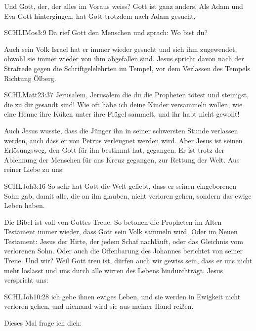 \documentclass[fontsize=16pt]{mybib}
\begin{document}
    Und Gott, der, der alles im Voraus weiss? Gott ist ganz anders. Als Adam und Eva Gott hintergingen, hat Gott trotzdem nach Adam gesucht.
    \begin{bibelbox}{SCHL}{IMos}{3:9}
    Da rief Gott den Menschen und sprach: Wo bist du?
    \end{bibelbox}
    Auch sein Volk Israel hat er immer wieder gesucht und sich ihm zugewendet, obwohl sie immer wieder von ihm abgefallen sind. Jesus spricht davon nach der Strafrede gegen die Schriftgelelehrten im Tempel, vor dem Verlassen des Tempels Richtung Ölberg. 
    \begin{bibelbox}{SCHL}{Matt}{23:37}
        Jerusalem, Jerusalem die du die Propheten tötest und steinigst, die zu dir gesandt sind! Wie oft habe ich deine Kinder versammeln wollen, wie eine Henne ihre Küken unter ihre Flügel sammelt, und ihr habt nicht gewollt!
    \end{bibelbox}
    Auch Jesus wusste, dass die Jünger ihn in seiner schwersten Stunde verlassen werden, auch dass er von Petrus verleugnet werden wird. Aber Jesus ist seinen Erlösungsweg, den Gott für ihn bestimmt hat, gegangen. Er ist trotz der Ablehnung der Menschen für ans Kreuz gegangen, zur Rettung der Welt. Aus reiner Liebe zu uns:
    \begin{bibelbox}{SCHL}{Joh}{3:16}
    So sehr hat Gott die Welt geliebt, dass er seinen eingeborenen Sohn gab, damit alle, die an ihn glauben, nicht verloren gehen, sondern das ewige Leben haben.
    \end{bibelbox}
    Die Bibel ist voll von Gottes Treue. So betonen die Propheten im Alten Testament immer wieder, dass Gott sein Volk sammeln wird. Oder im Neuen Testament: Jesus der Hirte, der jedem Schaf nachläuft, oder das Gleichnis vom verlorenen Sohn. Oder auch die Offenbarung des Johannes berichtet von seiner Treue. Und wir? Weil Gott treu ist, dürfen auch wir gewiss sein, dass er uns nicht mehr loslässt und uns durch alle wirren des Lebens hindurchträgt. Jesus verspricht uns:
    \begin{bibelbox}{SCHL}{Joh}{10:28}
    ich gebe ihnen ewiges Leben, und sie werden in Ewigkeit nicht verloren gehen, und niemand wird sie aus meiner Hand reißen.
    \end{bibelbox}
    Dieses Mal frage ich dich: 
\end{document}
